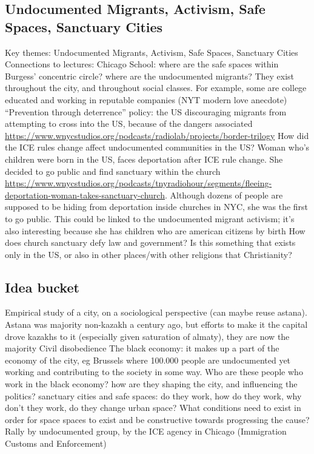 \documentclass{article}
\begin{document}
\subsection{Undocumented Migrants, Activism, Safe Spaces, Sanctuary Cities}

\begin{outline}
	\1 Key themes: Undocumented Migrants, Activism, Safe Spaces, Sanctuary Cities
	\1 Connections to lectures:
		\2 Chicago School: where are the safe spaces within Burgess' concentric circle? where are the undocumented migrants? They exist throughout the city, and throughout social classes. For example, some are college educated and working in reputable companies (NYT modern love anecdote)
	\1 ``Prevention through deterrence'' policy: the US discouraging migrants from attempting to cross into the US, because of the dangers associated \url{https://www.wnycstudios.org/podcasts/radiolab/projects/border-trilogy}
		\2 How did the ICE rules change affect undocumented communities in the US?
		\2 Woman who's children were born in the US, faces deportation after ICE rule change. She decided to go public and find sanctuary within the church \url{https://www.wnycstudios.org/podcasts/tnyradiohour/segments/fleeing-deportation-woman-takes-sanctuary-church}. Although dozens of people are supposed to be hiding from deportation inside churches in NYC, she was the first to go public. This could be linked to the undocumented migrant activism; it's also interesting because she has children who are american citizens by birth
		\2 How does church sanctuary defy law and government? Is this something that exists only in the US, or also in other places/with other religions that Christianity?
		
\end{outline}

\subsection{Idea bucket}

\begin{outline}
	\1 Empirical study of a city, on a sociological perspective (can maybe reuse astana). Astana was majority non-kazakh a century ago, but efforts to make it the capital drove kazakhs to it (especially given saturation of almaty), they are now the majority
	\1 Civil disobedience 
	\1 The black economy: it makes up a part of the economy of the city, eg Brussels where 100.000 people are undocumented yet working and contributing to the society in some way. Who are these people who work in the black economy? how are they shaping the city, and influencing the politics?
	\1 sanctuary cities and safe spaces: do they work, how do they work, why don't they work, do they change urban space?
		\2 What conditions need to exist in order for space spaces to exist and be constructive towards progressing the cause?
		\2 Rally by undocumented group, by the ICE agency in Chicago (Immigration Customs and Enforcement)
\end{outline}


\begin{outline}
	\1
\end{outline}

\fi
\end{document}

